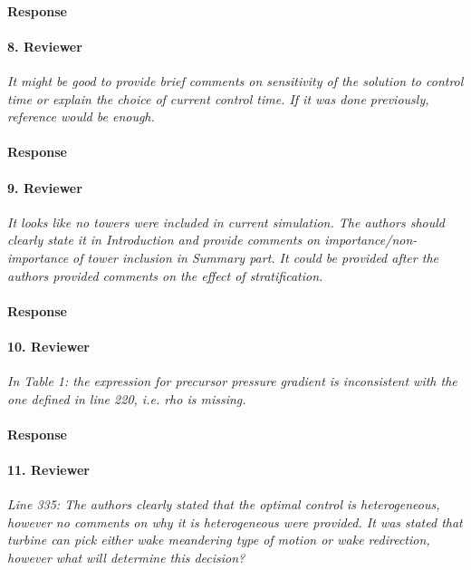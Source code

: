 \documentclass[]{article}
\begin{document}
\paragraph{Response} 

\hrulefill

\paragraph{8. Reviewer} \textit{It might be good to provide brief comments on sensitivity of the solution to control time or explain the choice of current control time. If it was done previously, reference would be enough.}

\paragraph{Response} 

\hrulefill

\paragraph{9. Reviewer} \textit{It looks like no towers were included in current simulation. The authors should clearly state it in Introduction and provide comments on importance/non-importance of tower inclusion in Summary part. It could be provided after the authors provided comments on the effect of stratification.}

\paragraph{Response} 

\hrulefill

\paragraph{10. Reviewer} \textit{In Table 1: the expression for precursor pressure gradient is inconsistent with the one defined in line 220, i.e. rho is missing.}

\paragraph{Response} 

\hrulefill

\paragraph{11. Reviewer} \textit{Line 335: The authors clearly stated that the optimal control is heterogeneous, however no comments on why it is heterogeneous were provided. It was stated that turbine can pick either wake meandering type of motion or wake redirection, however what will determine this decision?}
\end{document}
